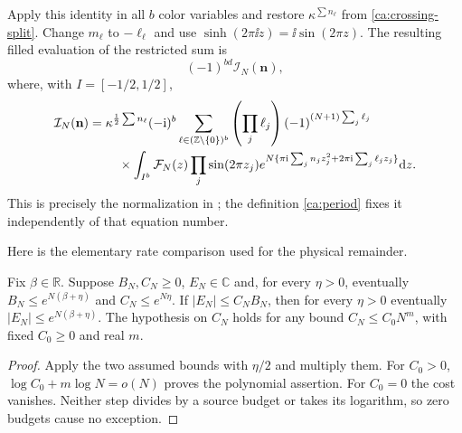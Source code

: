 Apply this identity in all $b$ color variables and restore
$\kappa^{\sum n_\ell}$ from \eqref{ca:crossing-split}. Change $m_\ell$ to $-\ell_\ell$ and use $\sinh(2\pi\ii z)=\ii\sin(2\pi z)$. The resulting filled evaluation of the restricted sum is
\begin{equation}\label{ca:generic-period}
 (-1)^{bd}\mathcal I_N(\mathbf n),
\end{equation}
where, with $I=[-1/2,1/2]$,
\begin{align}
 \mathcal I_N(\mathbf n)
 ={}&\kappa^{\frac12\sum n_\ell}(-\mathrm i)^b
 \sum_{\ell\in(\mathbb Z\setminus\{0\})^b}
       \left(\prod_j\ell_j\right)(-1)^{(N+1)\sum_j\ell_j}\notag\\
 &\quad\times\int_{I^b}\mathcal F_N(z)
       \prod_j\sin(2\pi z_j)
       e^{N\{\pi\mathrm i\sum_jn_jz_j^2+
                         2\pi\mathrm i\sum_j\ell_jz_j\}}\mathrm d z.\label{ca:period}
\end{align}
This is precisely the normalization in \cite[equation (1.6)]{Filling}; the definition \eqref{ca:period} fixes it independently of that equation number.

Here is the elementary rate comparison used for the physical remainder.
\begin{lemma}\label{ca:subexponential-cost}
Fix $\beta\in\mathbb R$. Suppose $B_N,C_N\ge0$, $E_N\in\mathbb C$
and, for every $\eta>0$, eventually
$B_N\le e^{N(\beta+\eta)}$ and $C_N\le e^{N\eta}$.
If $|E_N|\le C_NB_N$, then for every $\eta>0$ eventually
$|E_N|\le e^{N(\beta+\eta)}$.
The hypothesis on $C_N$ holds for any bound
$C_N\le C_0N^m$, with fixed $C_0\ge0$ and real $m$.
\end{lemma}
\begin{proof}
Apply the two assumed bounds with $\eta/2$ and multiply them.
For $C_0>0$, $\log C_0+m\log N=o(N)$ proves the polynomial assertion.
For $C_0=0$ the cost vanishes. Neither step divides by a source
budget or takes its logarithm, so zero budgets cause no exception.
\end{proof}


